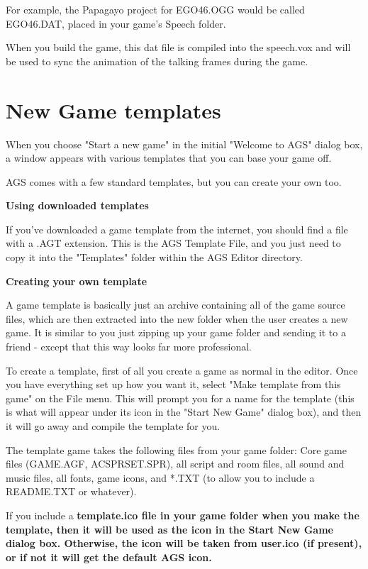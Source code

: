 For example, the Papagayo project for EGO46.OGG would be called EGO46.DAT, placed in your game's
Speech folder.

When you build the game, this dat file is compiled into the speech.vox and will be used to sync
the animation of the talking frames during the game.


\section{New Game templates}%

When you choose "Start a new game" in the initial "Welcome to AGS" dialog
box, a window appears with various templates that you can base your game off.

AGS comes with a few standard templates, but you can create your own too.

\bf{Using downloaded templates}

If you've downloaded a game template from the internet, you should find a file with
a .AGT extension. This is the AGS Template File, and you just need to copy it into
the "Templates" folder within the AGS Editor directory.

\bf{Creating your own template}

A game template is basically just an archive containing all of the game source files,
which are then extracted into the new folder when the user creates a new game. It is
similar to you just zipping up your game folder and sending it to a friend - except that
this way looks far more professional.

To create a template, first of all you create a game as normal in the editor. Once you
have everything set up how you want it, select "Make template from this game" on the File
menu. This will prompt you for a name for the template (this is what will appear under its
icon in the "Start New Game" dialog box), and then it will go away and compile the template
for you.

The template game takes the following files from your game folder:
Core game files (GAME.AGF, ACSPRSET.SPR), all script and room files, all sound and music
files, all fonts, game icons, and *.TXT (to allow you to include a README.TXT or whatever).

If you include a  \bf{template.ico} file in your game folder when you make the template,
then it will be used as the icon in the Start New Game dialog box. Otherwise, the icon will
be taken from user.ico (if present), or if not it will get the default AGS icon.

